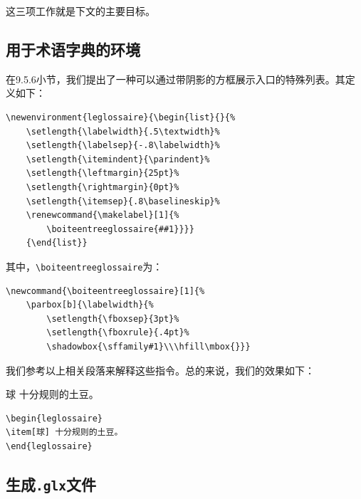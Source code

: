 这三项工作就是下文的主要目标。

\subsection{用于术语字典的环境}

在9.5.6小节，我们提出了一种可以通过带阴影的方框展示入口的特殊列表。其定义如下：

\begin{dmd}
\begin{verbatim}
\newenvironment{leglossaire}{\begin{list}{}{%
    \setlength{\labelwidth}{.5\textwidth}% 
    \setlength{\labelsep}{-.8\labelwidth}% 
    \setlength{\itemindent}{\parindent}% 
    \setlength{\leftmargin}{25pt}%
    \setlength{\rightmargin}{0pt}%
    \setlength{\itemsep}{.8\baselineskip}%
    \renewcommand{\makelabel}[1]{%
        \boiteentreeglossaire{##1}}}}
    {\end{list}}\end{verbatim}
\end{dmd}

其中，\verb|\boiteentreeglossaire|为：

\begin{dmd}
\begin{verbatim}
\newcommand{\boiteentreeglossaire}[1]{% 
    \parbox[b]{\labelwidth}{%
        \setlength{\fboxsep}{3pt}% 
        \setlength{\fboxrule}{.4pt}% 
        \shadowbox{\sffamily#1}\\\hfill\mbox{}}}\end{verbatim}
\end{dmd}

我们参考以上相关段落来解释这些指令。总的来说，我们的效果如下：

\begin{codelist}[11.28]{
\begin{leglossaire}
\item[球] 十分规则的土豆。
\end{leglossaire}
}
\begin{verbatim}
\begin{leglossaire}
\item[球] 十分规则的土豆。
\end{leglossaire}\end{verbatim}
\end{codelist}

\subsection{生成\texttt{.glx}文件}

